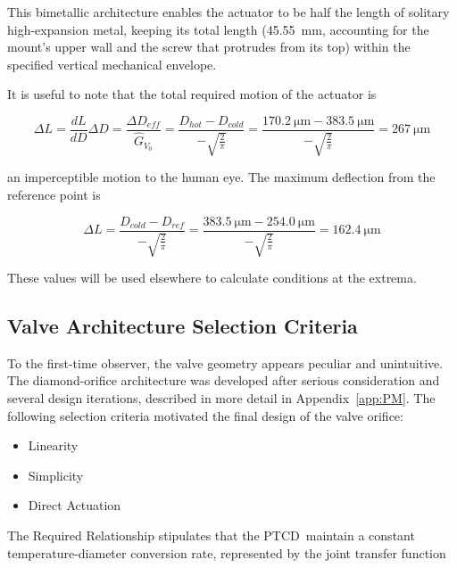 \documentclass[12pt, letterpaper]{report}%
\newcounter{mycounter}           %
\newcounter{sub}[mycounter]      %
\newcommand{\device}{PTCD}
\newcommand{\specActDefTotal}{\SI{267}{\micro \meter}}
\newcommand{\specActDefHot}{\SI{162.4}{\micro \meter}}
\begin{document}
				This bimetallic architecture enables the actuator to be half the length of solitary high-expansion metal, keeping its total length (\SI{45.55}{\milli\meter}, accounting for the mount's upper wall and the screw that protrudes from its top) within the specified vertical mechanical envelope.

				It is useful to note that the total required motion of the actuator is

				\begin{equation}
					\Delta L = \frac{dL}{dD} \Delta D = \frac{\Delta D_{eff}}{\hat{G}_{V_0}} = \frac{D_{hot} - D_{cold}}{-\sqrt{\frac{2}{\pi}}} = \frac{\SI{170.2}{\micro\meter} - \SI{383.5}{\micro\meter}}{-\sqrt{\frac{2}{\pi}}} = \specActDefTotal
				\end{equation}

				an imperceptible motion to the human eye. The maximum deflection from the reference point is

				\begin{equation}
					\Delta L = \frac{D_{cold} - D_{ref}}{-\sqrt{\frac{2}{\pi}}} = \frac{\SI{383.5}{\micro\meter} - \SI{254.0}{\micro\meter}}{-\sqrt{\frac{2}{\pi}}} = \specActDefHot
					\label{eq:act_def_hot}
				\end{equation}

				These values will be used elsewhere to calculate conditions at the extrema.

		\subsection{Valve Architecture Selection Criteria}
		\label{subsec:design:just:geo_sel}

			To the first-time observer, the valve geometry appears peculiar and unintuitive.
			The diamond-orifice architecture was developed after serious consideration and several design iterations, described in more detail in Appendix~\ref{app:PM}.
			The following selection criteria motivated the final design of the valve orifice:

			\begin{itemize}
				\item Linearity
				\item Simplicity
				\item Direct Actuation
			\end{itemize}

			The Required Relationship stipulates that the \device\ maintain a constant temperature-diameter conversion rate, represented by the joint transfer function
\end{document}
